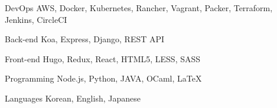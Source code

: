 

\begin{cvskills}

  \cvskill
    {DevOps} %
    {AWS, Docker, Kubernetes, Rancher, Vagrant, Packer, Terraform, Jenkins, CircleCI} %

  \cvskill
    {Back-end} %
    {Koa, Express, Django, REST API} %

  \cvskill
    {Front-end} %
    {Hugo, Redux, React, HTML5, LESS, SASS} %

  \cvskill
    {Programming} %
    {Node.js, Python, JAVA, OCaml, LaTeX} %

  \cvskill
    {Languages} %
    {Korean, English, Japanese} %

\end{cvskills}
